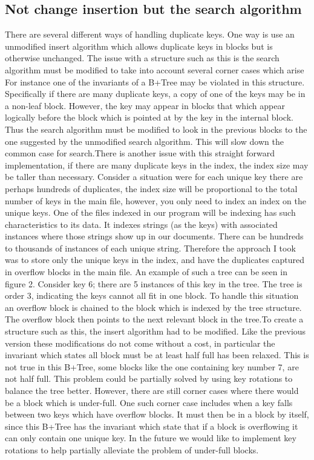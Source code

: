 \documentclass[abstracton,12pt]{scrreprt}
\begin{document}
\subsection{Not change insertion but the search algorithm}
There are several different ways of handling duplicate keys. One way is use an unmodified insert algorithm which allows duplicate keys in blocks but is otherwise unchanged. The issue with a structure such as this is the search algorithm must be modified to take into account several corner cases which arise
For instance one of the invariants of a B+Tree may be violated in this structure. Specifically if there are many duplicate keys, a copy of one of the keys may be in a non-leaf block. However, the key may appear in blocks that which appear logically before the block which is pointed at by the key in the internal block. Thus the search algorithm must be modified to look in the previous blocks to the one suggested by the unmodified search algorithm. This will slow down the common case for search.There is another issue with this straight forward implementation, if there are many duplicate keys in the index, the index size may be taller than necessary. Consider a situation were for each unique key there are perhaps hundreds of duplicates, the index size will be proportional to the total number of keys in the main file, however, you only need to index an index on the unique keys. One of the files indexed in our program will be indexing has such characteristics to its data. It indexes strings (as the keys) with associated instances where those strings show up in our documents. There can be hundreds to thousands of instances of each unique string.
Therefore the approach I took was to store only the unique keys in the index, and have the duplicates captured in overflow blocks in the main file. An example of such a tree can be seen in figure 2. Consider key 6; there are 5 instances of this key in the tree. The tree is order 3, indicating the keys cannot all fit in one block. To handle this situation an overflow block is chained to the block which is indexed by the tree structure. The overflow block then points to the next relevant block in the tree.To create a structure such as this, the insert algorithm had to be modified. Like the previous version these modifications do not come without a cost, in particular the invariant which states all block must be at least half full has been relaxed. This is not true in this B+Tree, some blocks like the one containing key number 7, are not half full. This problem could be partially solved by using key rotations to balance the tree better. However, there are still corner cases where there would be a block which is under-full. One such corner case includes when a key falls between two keys which have overflow blocks. It must then be in a block by itself, since this B+Tree has the invariant which state that if a block is overflowing it can only contain one unique key. In the future we would like to implement key rotations to help partially alleviate the problem of under-full blocks.
\end{document}
